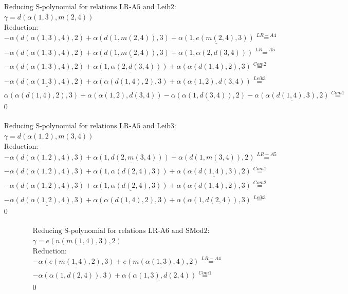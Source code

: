 \documentclass[11pt]{amsart}
\begin{document}
\begin{align*} 
& \text{Reducing S-polynomial for relations LR-A5 and Leib2:} \\ 
& \gamma = d(\alpha(1,3),m(2,4)) \\ 
& \text{Reduction}: \\& - \alpha(d(\alpha(1,3),4),2) + \alpha(d(1,m(2,4)),3) + \underline{\alpha(1,e(m(2,4),3))} \stackrel{ LR-A4 }{=}  \\ 
& - \alpha(d(\alpha(1,3),4),2) + \underline{\alpha(d(1,m(2,4)),3)} + \alpha(1,\alpha(2,d(3,4))) \stackrel{ LR-A5 }{=}  \\ 
& - \alpha(d(\alpha(1,3),4),2) + \underline{\alpha(1,\alpha(2,d(3,4)))} + \alpha(\alpha(d(1,4),2),3) \stackrel{ Com2 }{=}  \\ 
& - \underline{\alpha(d(\alpha(1,3),4),2)} + \alpha(\alpha(d(1,4),2),3) + \alpha(\alpha(1,2),d(3,4)) \stackrel{ Leib3 }{=}  \\ 
&\alpha(\alpha(d(1,4),2),3) + \alpha(\alpha(1,2),d(3,4)) - \underline{\alpha(\alpha(1,d(3,4)),2)} - \underline{\alpha(\alpha(d(1,4),3),2)} \stackrel{ Com1 }{=}  \\ 
&0\\ 
\end{align*} 
 
\begin{align*} 
& \text{Reducing S-polynomial for relations LR-A5 and Leib3:} \\ 
& \gamma = d(\alpha(1,2),m(3,4)) \\ 
& \text{Reduction}: \\& - \alpha(d(\alpha(1,2),4),3) + \underline{\alpha(1,d(2,m(3,4)))} + \underline{\alpha(d(1,m(3,4)),2)} \stackrel{ LR-A5 }{=}  \\ 
& - \alpha(d(\alpha(1,2),4),3) + \alpha(1,\alpha(d(2,4),3)) + \underline{\alpha(\alpha(d(1,4),3),2)} \stackrel{ Com1 }{=}  \\ 
& - \alpha(d(\alpha(1,2),4),3) + \underline{\alpha(1,\alpha(d(2,4),3))} + \alpha(\alpha(d(1,4),2),3) \stackrel{ Com2 }{=}  \\ 
& - \underline{\alpha(d(\alpha(1,2),4),3)} + \alpha(\alpha(d(1,4),2),3) + \alpha(\alpha(1,d(2,4)),3) \stackrel{ Leib3 }{=}  \\ 
&0\\ 
\end{align*} 
 
\begin{align*} 
& \text{Reducing S-polynomial for relations LR-A6 and SMod2:} \\ 
& \gamma = e(n(m(1,4),3),2) \\ 
& \text{Reduction}: \\& - \underline{\alpha(e(m(1,4),2),3)} + \underline{e(m(\alpha(1,3),4),2)} \stackrel{ LR-A4 }{=}  \\ 
& - \alpha(\alpha(1,d(2,4)),3) + \underline{\alpha(\alpha(1,3),d(2,4))} \stackrel{ Com1 }{=}  \\ 
&0\\ 
\end{align*} 
 
\end{document}
